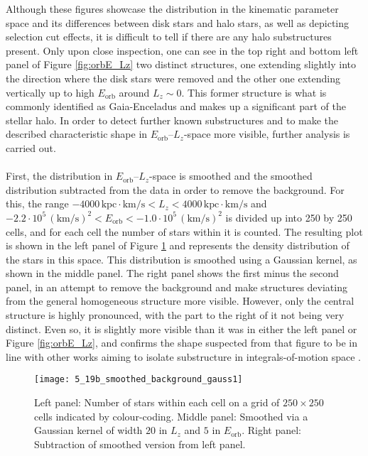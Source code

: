 \documentclass[a4paper,11pt]{article}
\begin{document}
%
Although these figures showcase the distribution in the kinematic parameter space and its differences between disk stars and halo stars, as well as depicting selection cut effects, it is difficult to tell if there are any halo substructures present. Only upon close inspection, one can see in the top right and bottom left panel of Figure \ref{fig:orbE_Lz} two distinct structures, one extending slightly into the direction where the disk stars were removed and the other one extending vertically up to high $E_\mathrm{orb}$ around $L_z\sim0$. This former structure is what is commonly identified as Gaia-Enceladus \citep{helmi18,koppelman18,koppelman19a} and makes up a significant part of the stellar halo. In order to detect further known substructures and to make the described characteristic shape in $E_\mathrm{orb}$--$L_z$-space more visible, further analysis is carried out.\\ \\
%
First, the distribution in $E_\mathrm{orb}$--$L_z$-space is smoothed and the smoothed distribution subtracted from the data in order to remove the background. For this, the range $-4000\,\mathrm{kpc}{\cdot}\mathrm{km/s}<L_z<4000\,\mathrm{kpc}{\cdot}\mathrm{km/s}$ and $-2.2\cdot10^5\,\mathrm{(km/s)}^2<E_\mathrm{orb}<-1.0\cdot10^5\,\mathrm{(km/s)}^2$ is divided up into 250 by 250 cells, and for each cell the number of stars within it is counted. The resulting plot is shown in the left panel of Figure \ref{fig:smoothed_orbE_Lz} and represents the density distribution of the stars in this space. This distribution is smoothed using a Gaussian kernel, as shown in the middle panel. The right panel shows the first minus the second panel, in an attempt to remove the background and make structures deviating from the general homogeneous structure more visible. However, only the central structure is highly pronounced, with the part to the right of it not being very distinct. Even so, it is slightly more visible than it was in either the left panel or Figure \ref{fig:orbE_Lz}, and confirms the shape suspected from that figure to be in line with other works aiming to isolate substructure in integrals-of-motion space \citep{naidu20,lovdal22,yuan20}.
%
\begin{figure}[ht]
 \centering
 \texttt{[image: 5\_19b\_smoothed\_background\_gauss1]}
 \caption[Smoothed and background-subtracted $E_\mathrm{orb}$--$L_z$-space]{Left panel: Number of stars within each cell on a grid of $250\times250$ cells indicated by colour-coding. Middle panel: Smoothed via a Gaussian kernel of width $20$ in $L_z$ and $5$ in $E_\mathrm{orb}$. Right panel: Subtraction of smoothed version from left panel.}
 \label{fig:smoothed_orbE_Lz}
\end{figure}\\
\end{document}

